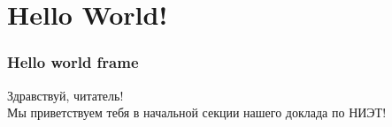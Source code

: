 \section{Hello World!} %


\begin{frame}[t]
\frametitle{Hello world frame}
Здравствуй, читатель!\\
Мы приветствуем тебя в начальной секции нашего доклада по НИЭТ!

\end{frame}